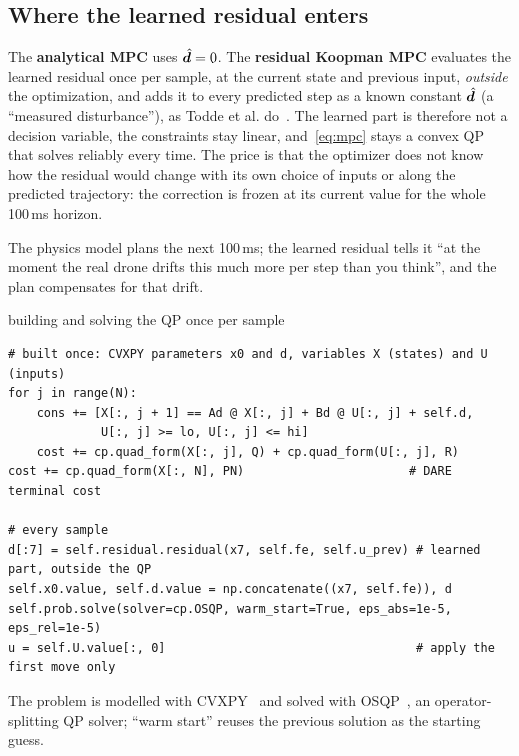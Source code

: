 \subsection{Where the learned residual enters}
The \textbf{analytical MPC} uses $\hat{\boldsymbol{d}} = 0$. The \textbf{residual Koopman MPC} evaluates the learned residual once per sample, at the current state and previous input, \emph{outside} the optimization, and adds it to every predicted step as a known constant $\hat{\boldsymbol{d}}$ (a ``measured disturbance''), as Todde et al. do~\cite{todde2026residual}. The learned part is therefore not a decision variable, the constraints stay linear, and~\eqref{eq:mpc} stays a convex QP that solves reliably every time. The price is that the optimizer does not know how the residual would change with its own choice of inputs or along the predicted trajectory: the correction is frozen at its current value for the whole 100\,ms horizon.

\begin{plain}
The physics model plans the next 100\,ms; the learned residual tells it ``at the moment the real drone drifts this much more per step than you think'', and the plan compensates for that drift.
\end{plain}

\begin{codebox}{building and solving the QP once per sample}
\begin{lstlisting}
# built once: CVXPY parameters x0 and d, variables X (states) and U (inputs)
for j in range(N):
    cons += [X[:, j + 1] == Ad @ X[:, j] + Bd @ U[:, j] + self.d,
             U[:, j] >= lo, U[:, j] <= hi]
    cost += cp.quad_form(X[:, j], Q) + cp.quad_form(U[:, j], R)
cost += cp.quad_form(X[:, N], PN)                       # DARE terminal cost

# every sample
d[:7] = self.residual.residual(x7, self.fe, self.u_prev) # learned part, outside the QP
self.x0.value, self.d.value = np.concatenate((x7, self.fe)), d
self.prob.solve(solver=cp.OSQP, warm_start=True, eps_abs=1e-5, eps_rel=1e-5)
u = self.U.value[:, 0]                                   # apply the first move only
\end{lstlisting}
\end{codebox}
The problem is modelled with CVXPY~\cite{diamond2016cvxpy} and solved with OSQP~\cite{stellato2020osqp}, an operator-splitting QP solver; ``warm start'' reuses the previous solution as the starting guess.

